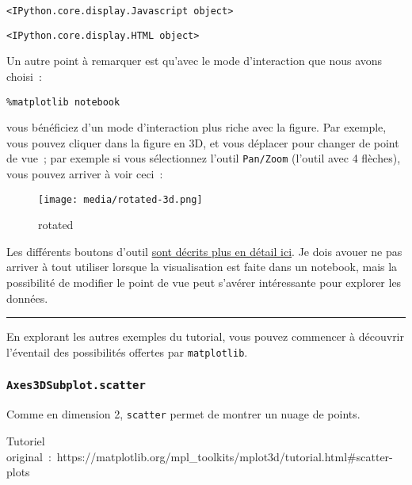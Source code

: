     
    \begin{verbatim}
<IPython.core.display.Javascript object>
    \end{verbatim}

    
    
    \begin{verbatim}
<IPython.core.display.HTML object>
    \end{verbatim}

    
    Un autre point à remarquer est qu'avec le mode d'interaction que nous
avons choisi~:

\begin{verbatim}
%matplotlib notebook
\end{verbatim}

vous bénéficiez d'un mode d'interaction plus riche avec la figure. Par
exemple, vous pouvez cliquer dans la figure en 3D, et vous déplacer pour
changer de point de vue~; par exemple si vous sélectionnez l'outil
\texttt{Pan/Zoom} (l'outil avec 4 flèches), vous pouvez arriver à voir
ceci~:

    \begin{figure}
\centering
\texttt{[image: media/rotated-3d.png]}
\caption{rotated}
\end{figure}

    Les différents boutons d'outil
\href{https://matplotlib.org/users/navigation_toolbar.html}{sont décrits
plus en détail ici}. Je dois avouer ne pas arriver à tout utiliser
lorsque la visualisation est faite dans un notebook, mais la possibilité
de modifier le point de vue peut s'avérer intéressante pour explorer les
données.

    \begin{center}\rule{0.5\linewidth}{\linethickness}\end{center}

    En explorant les autres exemples du tutorial, vous pouvez commencer à
découvrir l'éventail des possibilités offertes par \texttt{matplotlib}.

    \hypertarget{axes3dsubplot.scatter}{%
\subsubsection{\texorpdfstring{\texttt{Axes3DSubplot.scatter}}{Axes3DSubplot.scatter}}\label{axes3dsubplot.scatter}}

    Comme en dimension 2, \texttt{scatter} permet de montrer un nuage de
points.

Tutoriel
original~:~https://matplotlib.org/mpl\_toolkits/mplot3d/tutorial.html\#scatter-plots

